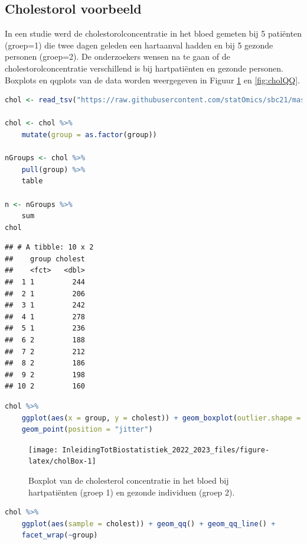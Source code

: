 \documentclass[
  12pt,dutch,coursenotes]{book}
\begin{document}
\hypertarget{cholestorol-voorbeeld}{%
\subsection{Cholestorol voorbeeld}\label{cholestorol-voorbeeld}}

In een studie werd de cholestorolconcentratie in het bloed gemeten bij 5 patiënten (groep=1) die twee dagen geleden een hartaanval hadden en bij 5 gezonde personen (groep=2).
De onderzoekers wensen na te gaan of de cholestorolconcentratie verschillend is bij hartpatiënten en gezonde personen.
Boxplots en qqplots van de data worden weergegeven in Figuur \ref{fig:cholBox} en \ref{fig:cholQQ}.

\begin{lstlisting}[language=R]
chol <- read_tsv("https://raw.githubusercontent.com/statOmics/sbc21/master/data/chol.txt")

chol <- chol %>%
    mutate(group = as.factor(group))

nGroups <- chol %>%
    pull(group) %>%
    table

n <- nGroups %>%
    sum
chol
\end{lstlisting}

\begin{lstlisting}
## # A tibble: 10 x 2
##    group cholest
##    <fct>   <dbl>
##  1 1         244
##  2 1         206
##  3 1         242
##  4 1         278
##  5 1         236
##  6 2         188
##  7 2         212
##  8 2         186
##  9 2         198
## 10 2         160
\end{lstlisting}

\begin{lstlisting}[language=R]
chol %>%
    ggplot(aes(x = group, y = cholest)) + geom_boxplot(outlier.shape = NA) +
    geom_point(position = "jitter")
\end{lstlisting}

\begin{figure}

{\centering \texttt{[image: InleidingTotBiostatistiek\_2022\_2023\_files/figure-latex/cholBox-1]} 

}

\caption{Boxplot van de cholesterol concentratie in het bloed bij hartpatiënten (groep 1) en gezonde individuen (groep 2).}\label{fig:cholBox}
\end{figure}

\begin{lstlisting}[language=R]
chol %>%
    ggplot(aes(sample = cholest)) + geom_qq() + geom_qq_line() +
    facet_wrap(~group)
\end{lstlisting}
\end{document}
